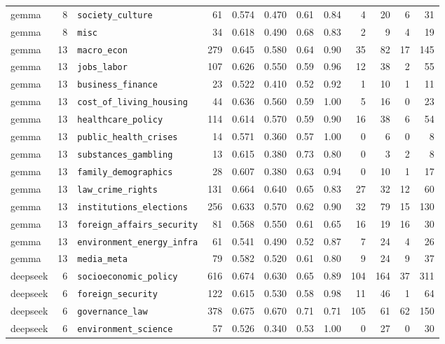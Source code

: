 \begin{landscape}
\begin{longtable}{@{}l r l r r r r r r r r r@{}}
gemma & 8 & \texttt{society\_culture} & 61 & 0.574 & 0.470 & 0.61 & 0.84 & 4 & 20 & 6 & 31\\
gemma & 8 & \texttt{misc} & 34 & 0.618 & 0.490 & 0.68 & 0.83 & 2 & 9 & 4 & 19\\
\midrule
gemma & 13 & \texttt{macro\_econ} & 279 & 0.645 & 0.580 & 0.64 & 0.90 & 35 & 82 & 17 & 145\\
gemma & 13 & \texttt{jobs\_labor} & 107 & 0.626 & 0.550 & 0.59 & 0.96 & 12 & 38 & 2 & 55\\
gemma & 13 & \texttt{business\_finance} & 23 & 0.522 & 0.410 & 0.52 & 0.92 & 1 & 10 & 1 & 11\\
gemma & 13 & \texttt{cost\_of\_living\_housing} & 44 & 0.636 & 0.560 & 0.59 & 1.00 & 5 & 16 & 0 & 23\\
gemma & 13 & \texttt{healthcare\_policy} & 114 & 0.614 & 0.570 & 0.59 & 0.90 & 16 & 38 & 6 & 54\\
gemma & 13 & \texttt{public\_health\_crises} & 14 & 0.571 & 0.360 & 0.57 & 1.00 & 0 & 6 & 0 & 8\\
gemma & 13 & \texttt{substances\_gambling} & 13 & 0.615 & 0.380 & 0.73 & 0.80 & 0 & 3 & 2 & 8\\
gemma & 13 & \texttt{family\_demographics} & 28 & 0.607 & 0.380 & 0.63 & 0.94 & 0 & 10 & 1 & 17\\
gemma & 13 & \texttt{law\_crime\_rights} & 131 & 0.664 & 0.640 & 0.65 & 0.83 & 27 & 32 & 12 & 60\\
gemma & 13 & \texttt{institutions\_elections} & 256 & 0.633 & 0.570 & 0.62 & 0.90 & 32 & 79 & 15 & 130\\
gemma & 13 & \texttt{foreign\_affairs\_security} & 81 & 0.568 & 0.550 & 0.61 & 0.65 & 16 & 19 & 16 & 30\\
gemma & 13 & \texttt{environment\_energy\_infra} & 61 & 0.541 & 0.490 & 0.52 & 0.87 & 7 & 24 & 4 & 26\\
gemma & 13 & \texttt{media\_meta} & 79 & 0.582 & 0.520 & 0.61 & 0.80 & 9 & 24 & 9 & 37\\
\midrule
deepseek & 6 & \texttt{socioeconomic\_policy} & 616 & 0.674 & 0.630 & 0.65 & 0.89 & 104 & 164 & 37 & 311\\
deepseek & 6 & \texttt{foreign\_security} & 122 & 0.615 & 0.530 & 0.58 & 0.98 & 11 & 46 & 1 & 64\\
deepseek & 6 & \texttt{governance\_law} & 378 & 0.675 & 0.670 & 0.71 & 0.71 & 105 & 61 & 62 & 150\\
deepseek & 6 & \texttt{environment\_science} & 57 & 0.526 & 0.340 & 0.53 & 1.00 & 0 & 27 & 0 & 30\\

\end{longtable}
\end{landscape}
